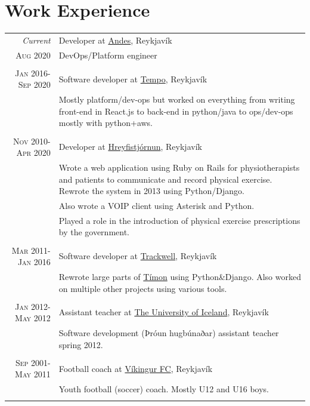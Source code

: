\documentclass[a4paper,10pt]{article}
\begin{document}
\section{Work Experience}
\begin{tabular}{r|p{10cm}}
 \emph{Current} & Developer at \href{www.andes.is}{Andes}, Reykjavík \\\textsc{Aug 2020}&\footnotesize{DevOps/Platform engineer}\\\multicolumn{2}{c}{} \\
 \textsc{Jan 2016-Sep 2020} & Software developer at \href{www.tempo.io}{Tempo}, Reykjavík \\&\footnotesize{Mostly platform/dev-ops but worked on everything from writing front-end in React.js to back-end in python/java to ops/dev-ops mostly with python+aws.}\\\multicolumn{2}{c}{} \\

 \textsc{Nov 2010-Apr 2020} & Developer at \href{www.hreyfistjornun.is}{Hreyfistjórnun}, Reykjavík \\&\footnotesize{Wrote a web application using Ruby on Rails for physiotherapists and patients to communicate and record physical exercise. Rewrote the
system in 2013 using Python/Django.}\\
& \footnotesize{Also wrote a VOIP client using Asterisk and Python.}\\
& \footnotesize{Played a role in the introduction of physical exercise
prescriptions by the government.}\\\multicolumn{2}{c}{} \\

 \textsc{Mar 2011-Jan 2016} & Software developer at \href{www.trackwell.com}{Trackwell}, Reykjavík \\&\footnotesize{Rewrote large parts of \href{www.timon.is}{Tímon} using Python\&Django. Also worked on multiple other projects using various tools.}\\\multicolumn{2}{c}{} \\

 \textsc{Jan 2012-May 2012} & Assistant teacher at \href{www.hi.is}{The University of Iceland}, Reykjavík \\&\footnotesize{Software development (Þróun hugbúnaðar) assistant teacher spring 2012.}\\\multicolumn{2}{c}{} \\

 \textsc{Sep 2001-May 2011} & Football coach at \href{www.vikingur.is}{Víkingur FC}, Reykjavík \\&\footnotesize{Youth football (soccer) coach. Mostly U12 and U16 boys.}\\\multicolumn{2}{c}{} \\

 \end{tabular}
\end{document}
